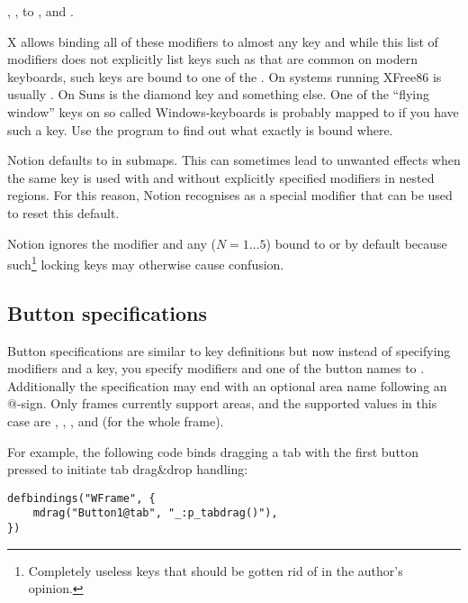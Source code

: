 , ,  to ,
 and .

X allows binding all of these modifiers to almost any key and while this
list of modifiers does not explicitly list keys such as 
 that are common on modern keyboards, such
keys are bound to one of the . On systems running XFree86
 is usually . On Suns  is the diamond key
and  something else. One of the ``flying window'' keys on so
called Windows-keyboards is probably mapped to  if you have
such a key. Use the program 
to find out what exactly is bound where. 

Notion defaults to  in submaps. This can sometimes lead to
unwanted effects when the same key is used with and without explicitly
specified modifiers in nested regions. For this reason, Notion recognises
 as a special modifier that can be used to reset this
default.

Notion ignores the  modifier and any  ($N=1{\ldots} 5$)
bound to  or
by default because such\footnote{Completely useless keys that should be
gotten rid of in the author's opinion.} locking keys may otherwise
cause confusion.


\subsection{Button specifications}

Button specifications are similar to key definitions but now
instead of specifying modifiers and a key, you specify modifiers
and one of the button names  to
. Additionally the
specification may end with an optional area name following an @-sign.
Only frames currently support areas, and the supported values in this
case are
, , ,  
and  (for the whole frame).

For example, the following code binds dragging a tab with the first 
button pressed to initiate tab drag\&drop handling:

\begin{verbatim}
defbindings("WFrame", {
    mdrag("Button1@tab", "_:p_tabdrag()"),
})
\end{verbatim}


